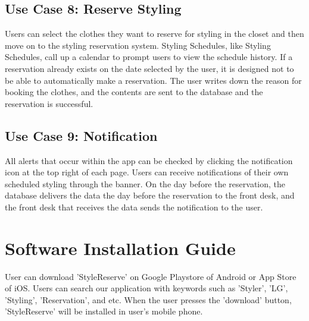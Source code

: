 \documentclass[conference]{IEEEtran}
\begin{document}
\subsection{Use Case 8: Reserve Styling}
Users can select the clothes they want to reserve for styling in the closet and then move on to the styling reservation system. Styling Schedules, like Styling Schedules, call up a calendar to prompt users to view the schedule history. If a reservation already exists on the date selected by the user, it is designed not to be able to automatically make a reservation. The user writes down the reason for booking the clothes, and the contents are sent to the database and the reservation is successful.

\subsection{Use Case 9: Notification}
All alerts that occur within the app can be checked by clicking the notification icon at the top right of each page. Users can receive notifications of their own scheduled styling through the banner. On the day before the reservation, the database delivers the data the day before the reservation to the front desk, and the front desk that receives the data sends the notification to the user.\\


\section{Software Installation Guide}
User can download ’StyleReserve’ on Google Playstore of Android or App Store of iOS. Users can search our application with keywords such as 'Styler', 'LG', 'Styling', 'Reservation', and
etc. When the user presses the ’download’ button, ’StyleReserve’
will be installed in user’s mobile phone.\\
\end{document}

